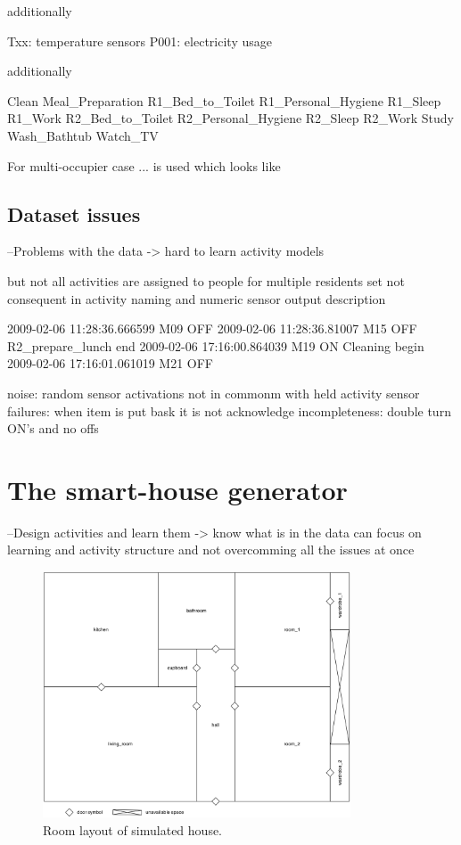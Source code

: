\documentclass[12pt, a4paper, pdflatex, leqno, twoside, openright]{report}
\begin{document}
additionally

   Txx:       temperature sensors
   P001:      electricity usage

additionally

   Clean
   Meal\_Preparation  
   R1\_Bed\_to\_Toilet
   R1\_Personal\_Hygiene
   R1\_Sleep
   R1\_Work
   R2\_Bed\_to\_Toilet
   R2\_Personal\_Hygiene
   R2\_Sleep
   R2\_Work
   Study
   Wash\_Bathtub
   Watch\_TV

For multi-occupier case ... is used which looks like


    \subsection{Dataset issues}
--Problems with the data -> hard to learn activity models

but not all activities are assigned to people for multiple residents set
not consequent in activity naming and numeric sensor output description

2009-02-06 11:28:36.666599 M09 OFF
2009-02-06 11:28:36.81007 M15 OFF R2\_prepare\_lunch end
2009-02-06 17:16:00.864039 M19 ON Cleaning begin
2009-02-06 17:16:01.061019 M21 OFF

noise: random sensor activations not in commonm with held activity
sensor failures: when item is put bask it is not acknowledge
incompleteness: double turn ON's and no offs

  \section{The smart-house generator}
--Design activities and learn them -> know what is in the data
can focus on learning and activity structure and not overcomming all the issues at once


\begin{figure}
  \centering%
  \includegraphics[height=7.3cm]{./gfx/room_layout}
  \caption{Room layout of simulated house.}
\end{figure}
\end{document}
